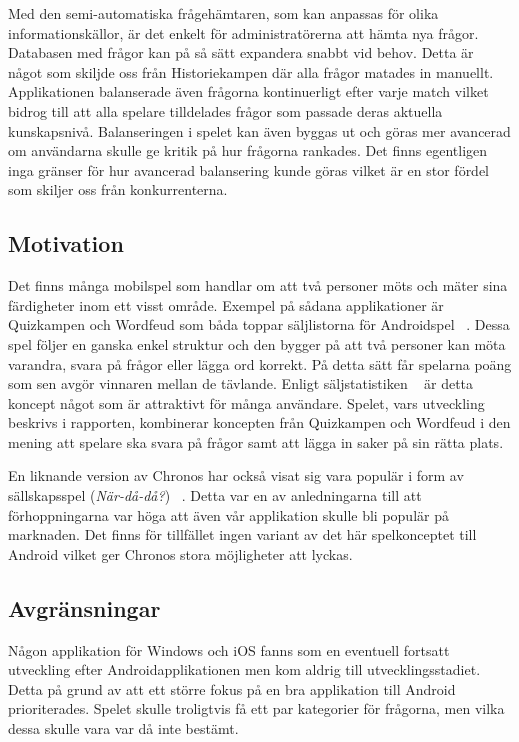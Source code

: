 \documentclass[a4paper, 11pt]{article}
\begin{document}
Med den semi-automatiska frågehämtaren, som kan anpassas för olika informationskällor, är det enkelt för administratörerna att hämta nya frågor. Databasen med frågor kan på så sätt expandera snabbt vid behov. Detta är något som skiljde oss från Historiekampen där alla frågor matades in manuellt. \\
Applikationen balanserade även frågorna kontinuerligt efter varje match vilket bidrog till att alla spelare tilldelades frågor som passade deras aktuella kunskapsnivå. Balanseringen i spelet kan även byggas ut och göras mer avancerad om användarna skulle ge kritik på hur frågorna rankades. Det finns egentligen inga gränser för hur avancerad balansering kunde göras vilket är en stor fördel som skiljer oss från konkurrenterna.

\subsection{Motivation}
Det finns många mobilspel som handlar om att två personer möts och mäter sina färdigheter inom ett visst område. Exempel på sådana applikationer är Quizkampen och Wordfeud som båda toppar säljlistorna för Androidspel ~\cite{appsalesrating}. Dessa spel följer en ganska enkel struktur och den bygger på att två personer kan möta varandra, svara på frågor eller lägga ord korrekt. På detta sätt får spelarna poäng som sen avgör vinnaren mellan de tävlande. Enligt säljstatistiken ~\cite{appsalesrating} är detta koncept något som är attraktivt för många användare. Spelet, vars utveckling beskrivs i rapporten, kombinerar koncepten från Quizkampen och Wordfeud i den mening att spelare ska svara på frågor samt att lägga in saker på sin rätta plats. 

En liknande version av Chronos har också visat sig vara populär i form av sällskapsspel (\textit{När-då-då?}) ~\cite{nardada}. Detta var en av anledningarna till att förhoppningarna var höga att även vår applikation skulle bli populär på marknaden. Det finns för tillfället ingen variant av det här spelkonceptet till Android vilket ger Chronos stora möjligheter att lyckas.

\subsection{Avgränsningar}
Någon applikation för Windows och iOS fanns som en eventuell fortsatt utveckling efter Androidapplikationen men kom aldrig till utvecklingsstadiet. Detta på grund av att ett större fokus på en bra applikation till Android prioriterades. Spelet skulle troligtvis få ett par kategorier för frågorna, men vilka dessa skulle vara var då inte bestämt. 
\end{document}
